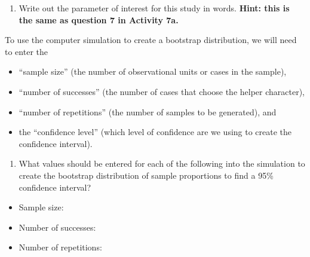 \documentclass[
]{report}
\providecommand{\tightlist}{%
  \setlength{\itemsep}{0pt}\setlength{\parskip}{0pt}}
\begin{document}
\begin{enumerate}
\def\labelenumi{\arabic{enumi}.}
\setcounter{enumi}{3}
\tightlist
\item
  Write out the parameter of interest for this study in words. \textbf{Hint: this is the same as question 7 in Activity 7a.}
\end{enumerate}

\vspace{0.5in}

To use the computer simulation to create a bootstrap distribution, we will need to enter the

\begin{itemize}
\tightlist
\item
  ``sample size'' (the number of observational units or cases in the sample),
\item
  ``number of successes'' (the number of cases that choose the helper character),
\item
  ``number of repetitions'' (the number of samples to be generated), and
\item
  the ``confidence level'' (which level of confidence are we using to create the confidence interval).
\end{itemize}

\begin{enumerate}
\def\labelenumi{\arabic{enumi}.}
\setcounter{enumi}{4}
\tightlist
\item
  What values should be entered for each of the following into the simulation to create the bootstrap distribution of sample proportions to find a 95\% confidence interval?
  \vspace{1mm}
\end{enumerate}

\begin{itemize}
\tightlist
\item
  Sample size:
\end{itemize}

\vspace{.1in}

\begin{itemize}
\tightlist
\item
  Number of successes:
\end{itemize}

\vspace{.1in}

\begin{itemize}
\tightlist
\item
  Number of repetitions:
\end{itemize}
\end{document}
